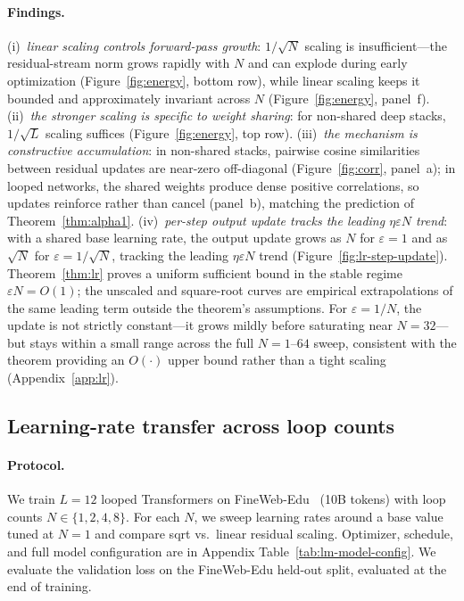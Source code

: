 \paragraph{Findings.}
(i)~\emph{linear scaling controls forward-pass growth}: $1/\!\sqrt{N}$ scaling is insufficient---the residual-stream norm grows rapidly with $N$ and can explode during early optimization (Figure~\ref{fig:energy}, bottom row), while linear scaling keeps it bounded and approximately invariant across $N$ (Figure~\ref{fig:energy}, panel~f).
(ii)~\emph{the stronger scaling is specific to weight sharing}: for non-shared deep stacks, $1/\!\sqrt{L}$ scaling suffices (Figure~\ref{fig:energy}, top row).
(iii)~\emph{the mechanism is constructive accumulation}: in non-shared stacks, pairwise cosine similarities between residual updates are near-zero off-diagonal (Figure~\ref{fig:corr}, panel~a); in looped networks, the shared weights produce dense positive correlations, so updates reinforce rather than cancel (panel~b), matching the prediction of Theorem~\ref{thm:alpha1}.
(iv)~\emph{per-step output update tracks the leading $\eta\varepsilon N$ trend}: with a shared base learning rate, the output update grows as $N$ for $\varepsilon{=}1$ and as $\sqrt{N}$ for $\varepsilon{=}1/\!\sqrt{N}$, tracking the leading $\eta\varepsilon N$ trend (Figure~\ref{fig:lr-step-update}).
Theorem~\ref{thm:lr} proves a uniform sufficient bound in the stable regime $\varepsilon N=O(1)$; the unscaled and square-root curves are empirical extrapolations of the same leading term outside the theorem's assumptions.
For $\varepsilon{=}1/N$, the update is not strictly constant---it grows mildly before saturating near $N{=}32$---but stays within a small range across the full $N{=}1$--$64$ sweep, consistent with the theorem providing an $O(\cdot)$ upper bound rather than a tight scaling (Appendix~\ref{app:lr}).

\subsection{Learning-rate transfer across loop counts}
\label{sec:lm-transfer}

\paragraph{Protocol.}
We train $L{=}12$ looped Transformers on FineWeb-Edu~\citep{penedo2024fineweb} (10B tokens) with loop counts $N\in\{1,2,4,8\}$.
For each $N$, we sweep learning rates around a base value tuned at $N{=}1$ and compare sqrt vs.\ linear residual scaling.
Optimizer, schedule, and full model configuration are in Appendix Table~\ref{tab:lm-model-config}. 
We evaluate the validation loss on the FineWeb-Edu held-out split, evaluated at the end of training.

